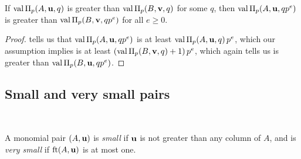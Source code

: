 \documentclass[11pt]{amsart}
\begin{document}
\begin{corollary}
   \label{cor: mu comparison}
   If $\operatorname{val} \Pi_p(A, \mathbf{u}, q)$ is greater than $\operatorname{val} \Pi_p(B, \mathbf{v}, q)$ for some $q$, then $\operatorname{val} \Pi_p(A, \mathbf{u}, qp^e)$ is greater than $\operatorname{val} \Pi_p(B, \mathbf{v}, qp^e)$ for all $e \geq 0$.
\end{corollary}

\begin{proof}
     tells us that $\operatorname{val} \Pi_p(A, \mathbf{u}, qp^e)$ is at least $\operatorname{val} \Pi_p(A, \mathbf{u}, q) \, p^e$, which our assumption implies is at least $(\operatorname{val} \Pi_p(B, \mathbf{v}, q)+1)\, p^e$, which  again tells us is greater than $\operatorname{val} \Pi_p(B, \mathbf{u}, qp^e)$. 
%    
\end{proof}

\subsection{Small and very small pairs}

\ 

\begin{definition}
A monomial pair $(A, \mathbf{u})$ is \emph{small} if $\mathbf{u}$ is not greater than any column of $A$, and is \emph{very small} if $\operatorname{ft}(A, \mathbf{u})$ is at most one. 
\end{definition}
\end{document}

